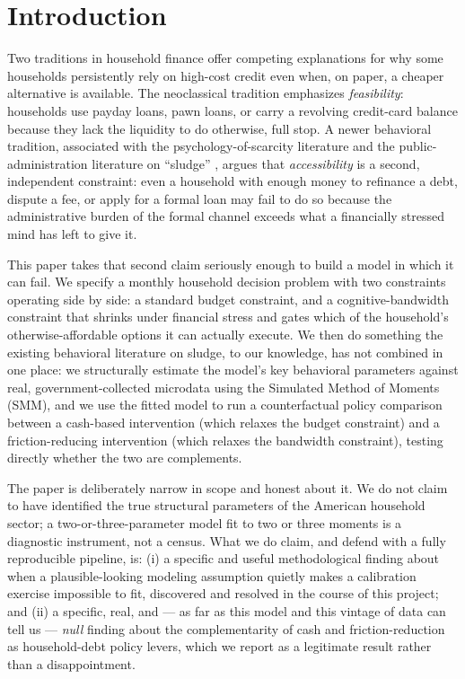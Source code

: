 \documentclass[12pt]{article}
\begin{document}
\newpage
\tableofcontents
\newpage

\section{Introduction}

Two traditions in household finance offer competing explanations for why some households persistently rely on high-cost credit even when, on paper, a cheaper alternative is available. The neoclassical tradition emphasizes \emph{feasibility}: households use payday loans, pawn loans, or carry a revolving credit-card balance because they lack the liquidity to do otherwise, full stop. A newer behavioral tradition, associated with the psychology-of-scarcity literature \cite{mullainathan2013scarcity} and the public-administration literature on ``sludge'' \cite{sunstein2019sludge, bhargava2015psychological}, argues that \emph{accessibility} is a second, independent constraint: even a household with enough money to refinance a debt, dispute a fee, or apply for a formal loan may fail to do so because the administrative burden of the formal channel exceeds what a financially stressed mind has left to give it.

This paper takes that second claim seriously enough to build a model in which it can fail. We specify a monthly household decision problem with two constraints operating side by side: a standard budget constraint, and a cognitive-bandwidth constraint that shrinks under financial stress and gates which of the household's otherwise-affordable options it can actually execute. We then do something the existing behavioral literature on sludge, to our knowledge, has not combined in one place: we structurally estimate the model's key behavioral parameters against real, government-collected microdata using the Simulated Method of Moments (SMM), and we use the fitted model to run a counterfactual policy comparison between a cash-based intervention (which relaxes the budget constraint) and a friction-reducing intervention (which relaxes the bandwidth constraint), testing directly whether the two are complements.

The paper is deliberately narrow in scope and honest about it. We do not claim to have identified the true structural parameters of the American household sector; a two-or-three-parameter model fit to two or three moments is a diagnostic instrument, not a census. What we do claim, and defend with a fully reproducible pipeline, is: (i) a specific and useful methodological finding about when a plausible-looking modeling assumption quietly makes a calibration exercise impossible to fit, discovered and resolved in the course of this project; and (ii) a specific, real, and — as far as this model and this vintage of data can tell us — \emph{null} finding about the complementarity of cash and friction-reduction as household-debt policy levers, which we report as a legitimate result rather than a disappointment.
\end{document}
